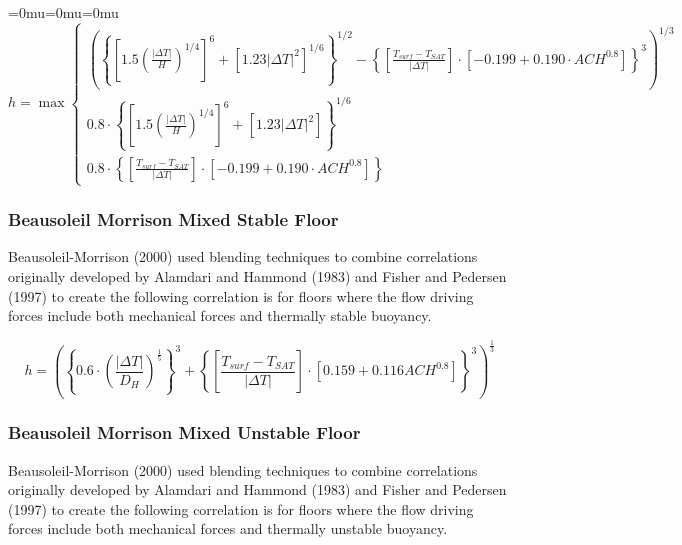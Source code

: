 {\medmuskip=0mu\thinmuskip=0mu\thickmuskip=0mu\nulldelimiterspace=0pt\scriptspace=0pt
\begin{equation}
h = \max \left\{
\begin{array}{l}
\left(\left\{\left[1.5\left(\frac{\left|\Delta T\right|}{H}\right)^{1/4}\right]^6+\left[1.23\left|\Delta T\right|^2\right]^{1/6}\right\}^{1/2}-\left\{\left[\frac{T_{surf}-T_{SAT}}{\left|\Delta T\right|}\right]\cdot\left[-0.199+0.190\cdot ACH^{0.8}\right]\right\}^3\right)^{1/3} \\
0.8\cdot \left\{\left[1.5\left(\frac{\left|\Delta T\right|}{H}\right)^{1/4}\right]^6+\left[1.23\left|\Delta T\right|^2\right]\right\}^{1/6} \\
0.8\cdot \left\{\left[\frac{T_{surf}-T_{SAT}}{\left|\Delta T\right|}\right]\cdot\left[-0.199+0.190\cdot ACH^{0.8}\right]\right\}
\end{array}
\right.
\end{equation}}

\subsubsection{Beausoleil Morrison Mixed Stable Floor}\label{beausoleil-morrison-mixed-stable-floor}

Beausoleil-Morrison (2000) used blending techniques to combine correlations originally developed by Alamdari and Hammond (1983) and Fisher and Pedersen (1997) to create the following correlation is for floors where the flow driving forces include both mechanical forces and thermally stable buoyancy.

\begin{equation}
h = {\left( {{{\left\{ {0.6 \cdot {{\left( {\frac{{\left| {\Delta T} \right|}}{{{D_H}}}} \right)}^{{\frac{1}{5}}}}} \right\}}^3} + {{\left\{ {\left[ {\frac{{{T_{surf}} - {T_{SAT}}}}{{\left| {\Delta T} \right|}}} \right]\cdot\left[ {0.159 + 0.116AC{H^{0.8}}} \right]} \right\}}^3}} \right)^{{\frac{1}{3}}}}
\end{equation}

\subsubsection{Beausoleil Morrison Mixed Unstable Floor}\label{beausoleil-morrison-mixed-unstable-floor}

Beausoleil-Morrison (2000) used blending techniques to combine correlations originally developed by Alamdari and Hammond (1983) and Fisher and Pedersen (1997) to create the following correlation is for floors where the flow driving forces include both mechanical forces and thermally unstable buoyancy.

